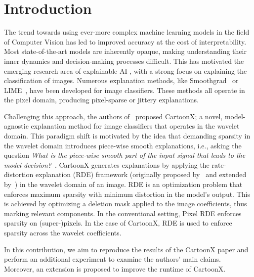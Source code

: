 
\section{Introduction}
The trend towards using ever-more complex machine learning models in the field of Computer Vision has led to improved accuracy at the cost of interpretability. 
Most state-of-the-art models are inherently opaque, making understanding their inner dynamics and decision-making processes difficult. 
This has motivated the emerging research area of explainable AI \cite{das2020opportunities}, with a strong focus on explaining the classification of images. Numerous explanation methods, like Smoothgrad~\cite{smilkov2017smoothgrad} or LIME~\cite{ribeiro2016lime}, have been developed for image classifiers.
These methods all operate in the pixel domain, producing pixel-sparse or jittery explanations. 

Challenging this approach, the authors of~\cite{cartoonX} proposed CartoonX; a novel, model-agnostic explanation method for image classifiers that operates in the wavelet domain.
This paradigm shift is motivated by the idea that demanding sparsity in the wavelet domain introduces piece-wise smooth explanations, i.e., asking the question \textit{What is the piece-wise smooth part of the input signal that leads to the model decision?}~\cite{cartoonX}.
CartoonX generates explanations by applying the rate-distortion explanation (RDE) framework (originally proposed by~\cite{rdeOriginal} and extended by~\cite{rdeExtend}) in the wavelet domain of an image.
RDE is an optimization problem that enforces maximum sparsity with minimum distortion in the model's output.
This is achieved by optimizing a deletion mask applied to the image coefficients, thus marking relevant components.
In the conventional setting, Pixel RDE enforces sparsity on (super-)pixels.
In the case of CartoonX, RDE is used to enforce sparsity across the wavelet coefficients.

In this contribution, we aim to reproduce the results of the CartoonX paper and perform an additional experiment to examine the authors' main claims. Moreover, an extension is proposed to improve the runtime of CartoonX. 


